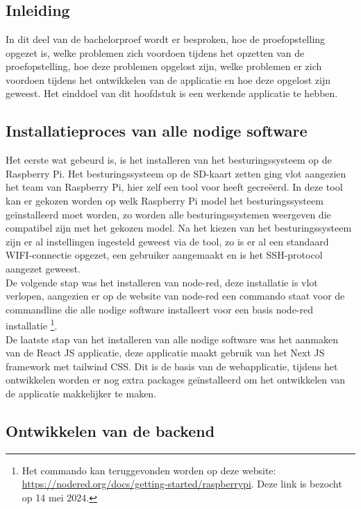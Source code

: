\chapter{}
\label{ch:proefopstelling}

\section{Inleiding}
\label{sec:proefopstelling-inleiding}

In dit deel van de bachelorproef wordt er besproken, hoe de proefopstelling opgezet is, welke problemen zich voordoen tijdens het opzetten van de proefopstelling, hoe deze problemen opgelost zijn, welke problemen er zich voordoen tijdens het ontwikkelen van de applicatie en hoe deze opgelost zijn geweest. Het einddoel van dit hoofdstuk is een werkende applicatie te hebben.

\section{Installatieproces van alle nodige software}
\label{sec:proefopstelling-opzetten}

Het eerste wat gebeurd is, is het installeren van het besturingssysteem op de Raspberry Pi. Het besturingssysteem op de SD-kaart zetten ging vlot aangezien het team van Raspberry Pi, hier zelf een tool voor heeft gecreëerd. In deze tool kan er gekozen worden op welk Raspberry Pi model het besturingssysteem geïnstalleerd moet worden, zo worden alle besturingssystemen weergeven die compatibel zijn met het gekozen model. Na het kiezen van het besturingssysteem zijn er al instellingen ingesteld geweest via de tool, zo is er al een standaard WIFI-connectie opgezet, een gebruiker aangemaakt en is het SSH-protocol aangezet geweest.\\

De volgende stap was het installeren van node-red, deze installatie is vlot verlopen, aangezien er op de website van node-red een commando staat voor de commandline die alle nodige software installeert voor een basis node-red installatie \footnote{Het commando kan teruggevonden worden op deze website: \url{https://nodered.org/docs/getting-started/raspberrypi}. Deze link is bezocht op 14 mei 2024.}.\\

De laatste stap van het installeren van alle nodige software was het aanmaken van de React JS applicatie, deze applicatie maakt gebruik van het Next JS framework met tailwind CSS. Dit is de basis van de webapplicatie, tijdens het ontwikkelen worden er nog extra packages geïnstalleerd om het ontwikkelen van de applicatie makkelijker te maken.

\section{Ontwikkelen van de backend}
\label{sec:proefopstelling-backend}